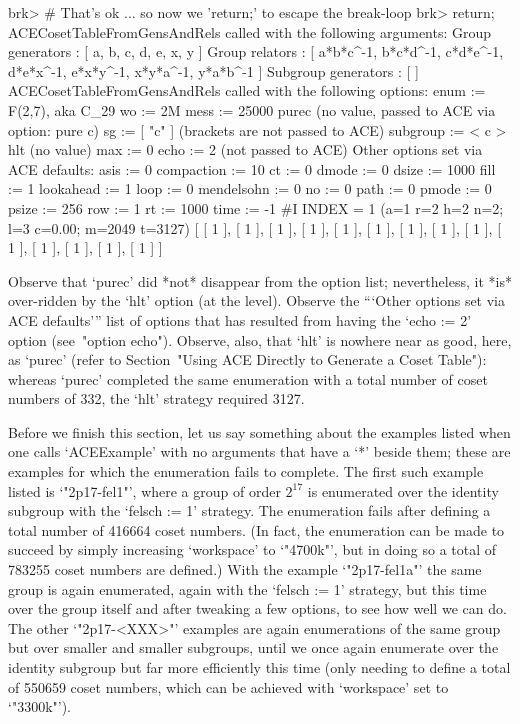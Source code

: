 brk> # That's ok ... so now we 'return;' to escape the break-loop
brk> return;
ACECosetTableFromGensAndRels called with the following arguments:
 Group generators : [ a, b, c, d, e, x, y ]
 Group relators : [ a*b*c^-1, b*c*d^-1, c*d*e^-1, d*e*x^-1, e*x*y^-1, 
  x*y*a^-1, y*a*b^-1 ]
 Subgroup generators : [  ]
ACECosetTableFromGensAndRels called with the following options:
 enum := F(2,7), aka C_29
 wo := 2M
 mess := 25000
 purec (no value, passed to ACE via option: pure c)
 sg := [ "c" ] (brackets are not passed to ACE)
 subgroup := < c >
 hlt (no value)
 max := 0
 echo := 2 (not passed to ACE)
Other options set via ACE defaults:
 asis := 0
 compaction := 10
 ct := 0
 dmode := 0
 dsize := 1000
 fill := 1
 lookahead := 1
 loop := 0
 mendelsohn := 0
 no := 0
 path := 0
 pmode := 0
 psize := 256
 row := 1
 rt := 1000
 time := -1
#I  INDEX = 1 (a=1 r=2 h=2 n=2; l=3 c=0.00; m=2049 t=3127)
[ [ 1 ], [ 1 ], [ 1 ], [ 1 ], [ 1 ], [ 1 ], [ 1 ], [ 1 ], [ 1 ], [ 1 ], 
  [ 1 ], [ 1 ], [ 1 ], [ 1 ] ]

\endexample

Observe that  `purec'  did  *not*  disappear  from  the  option  list;
nevertheless, it *is* over-ridden by the `hlt' option (at  the  {\ACE}
level). Observe the  ```Other options set via ACE defaults''' list  of
options  that  has  resulted  from  having  the  `echo  :=  2'  option
(see~"option echo"). Observe, also, that  `hlt'  is  nowhere  near  as
good, here, as  `purec'  (refer  to  Section~"Using  ACE  Directly  to
Generate  a  Coset  Table"):  whereas  `purec'  completed   the   same
enumeration with a total number of coset numbers  of  332,  the  `hlt'
strategy required 3127.

Before we finish this section, let us say something about the examples
listed when one calls `ACEExample' with no arguments that have  a  `*'
beside them; these are examples for which  the  enumeration  fails  to
complete. The first such example  listed  is  `"2p17-fel1"',  where  a
group of order $2^{17}$ is enumerated over the identity subgroup  with
the `felsch := 1' strategy. The enumeration  fails  after  defining  a
total number of 416664 coset numbers. (In fact, the enumeration can be
made to succeed by simply increasing `workspace' to `"4700k"', but  in
doing so a total of  783255  coset  numbers  are  defined.)  With  the
example `"2p17-fel1a"' the same group is again enumerated, again  with
the `felsch := 1' strategy, but this time over the  group  itself  and
after tweaking a few options, to see how well we  can  do.  The  other
`"2p17-<XXX>"' examples are again enumerations of the same  group  but
over smaller and smaller subgroups, until we once again enumerate over
the identity subgroup but far more efficiently this time (only needing
to define a total of 550659 coset numbers, which can be achieved  with
`workspace' set to `"3300k"').

